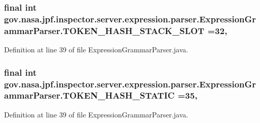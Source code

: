 \subsubsection[{\texorpdfstring{T\+O\+K\+E\+N\+\_\+\+H\+A\+S\+H\+\_\+\+S\+T\+A\+C\+K\+\_\+\+S\+L\+OT}{TOKEN_HASH_STACK_SLOT}}]{\setlength{\rightskip}{0pt plus 5cm}final int gov.\+nasa.\+jpf.\+inspector.\+server.\+expression.\+parser.\+Expression\+Grammar\+Parser.\+T\+O\+K\+E\+N\+\_\+\+H\+A\+S\+H\+\_\+\+S\+T\+A\+C\+K\+\_\+\+S\+L\+OT =32\hspace{0.3cm}{\ttfamily [static]}, {\ttfamily [package]}}\hypertarget{classgov_1_1nasa_1_1jpf_1_1inspector_1_1server_1_1expression_1_1parser_1_1_expression_grammar_parser_af911dcf03b24cbbe3be88f0445668139}{}\label{classgov_1_1nasa_1_1jpf_1_1inspector_1_1server_1_1expression_1_1parser_1_1_expression_grammar_parser_af911dcf03b24cbbe3be88f0445668139}


Definition at line 39 of file Expression\+Grammar\+Parser.\+java.

\subsubsection[{\texorpdfstring{T\+O\+K\+E\+N\+\_\+\+H\+A\+S\+H\+\_\+\+S\+T\+A\+T\+IC}{TOKEN_HASH_STATIC}}]{\setlength{\rightskip}{0pt plus 5cm}final int gov.\+nasa.\+jpf.\+inspector.\+server.\+expression.\+parser.\+Expression\+Grammar\+Parser.\+T\+O\+K\+E\+N\+\_\+\+H\+A\+S\+H\+\_\+\+S\+T\+A\+T\+IC =35\hspace{0.3cm}{\ttfamily [static]}, {\ttfamily [package]}}\hypertarget{classgov_1_1nasa_1_1jpf_1_1inspector_1_1server_1_1expression_1_1parser_1_1_expression_grammar_parser_a291146c24b193dc8ab6fbe0b40432881}{}\label{classgov_1_1nasa_1_1jpf_1_1inspector_1_1server_1_1expression_1_1parser_1_1_expression_grammar_parser_a291146c24b193dc8ab6fbe0b40432881}


Definition at line 39 of file Expression\+Grammar\+Parser.\+java.

